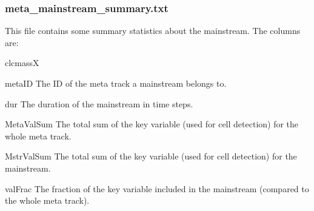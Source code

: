 \documentclass{scrartcl}
\begin{document}
\subsubsection{meta\_mainstream\_summary.txt}
This file contains some summary statistics about the mainstream. The columns are:
\begin{labeling}{clcmassX}
	\item[metaID] The ID of the meta track a mainstream belongs to.
	\item[dur] The duration of the mainstream in time steps.
	\item[MetaValSum] The total sum of the key variable (used for cell detection) for the whole meta track.
    \item[MstrValSum] The total sum of the key variable (used for cell detection) for the mainstream.
	\item[valFrac] The fraction of the key variable included in the mainstream (compared to the whole meta track).
\end{labeling}

\newpage


\end{document}
